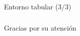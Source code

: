 \begin{frame}{Entorno tabular (3/3)}
	\tabularframesinglecontent{%
		\lipsum[1]
	}
\end{frame}


\begin{frame}[allowframebreaks]\normalsize
	\frametitle{\namereferences}
	
\end{frame}


\begin{frame}
	\centering
	\Huge{Gracias por su atención}
\end{frame}